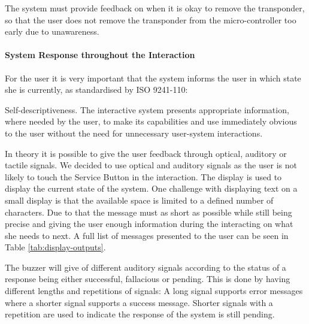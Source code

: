 
The system must provide feedback on when it is okay to remove the transponder, so that the user does not remove the transponder from the micro-controller too early due to unawareness.

\paragraph{System Response throughout the Interaction}

For the user it is very important that the system informs the user in which state she is currently, as standardised by ISO 9241-110:

\begin{principle}{Self-descriptiveness.}
The interactive system presents appropriate information, where needed by the user, to make its capabilities and use immediately obvious to the user without the need for unnecessary user-system interactions. \cite{ISO:9241-110:2020}
\end{principle}

In theory it is possible to give the user feedback through optical, auditory or tactile signals. We decided to use optical and auditory signals as the user is not likely to touch the Service Button in the interaction. The display is used to display the current state of the system. One challenge with displaying text on a small display is that the available space is limited to a defined number of characters. Due to that the message must as short as possible while still being precise and giving the user enough information during the interacting on what she needs to next. A full list of messages presented to the user can be seen in Table \ref{tab:display-outputs}.

The buzzer will give of different auditory signals according to the status of a response being either successful, fallacious or pending. This is done by having different lengths and repetitions of signals: A long signal supports error messages where a shorter signal supports a success message. Shorter signals with a repetition are used to indicate the response of the system is still pending. 



